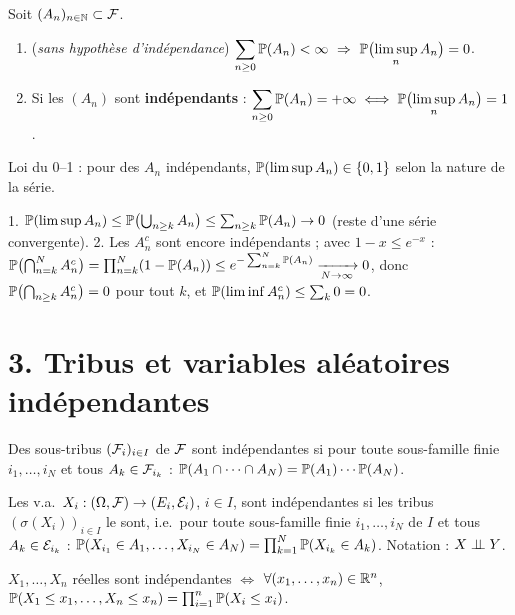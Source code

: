 \documentclass[11pt,a4paper]{article}
\begin{document}
\begin{theoreme}\label{C3:BC}
Soit $(A_n)_{n\in\mathbb{N}}\subset\mathcal{F}$.
\begin{enumerate}
  \item (\emph{sans hypothèse d'indépendance}) $\displaystyle\sum_{n\ge0}\PP(A_n)<\infty\ \Rightarrow\ \PP\bigl(\limsup_n A_n\bigr)=0$.
  \item Si les $(A_n)$ sont \textbf{indépendants} : $\displaystyle\sum_{n\ge0}\mathbb{P}(A_n)=+\infty\iff\mathbb{P}\bigl(\limsup_n A_n\bigr)=1$.
\end{enumerate}
Loi du 0--1 : pour des $A_n$ indépendants, $\mathbb{P}(\limsup A_n)\in\{0,1\}$ selon la nature de la série.
\end{theoreme}
\begin{idee}
1. $\mathbb{P}(\limsup A_n)\le\mathbb{P}\bigl(\bigcup_{n\ge k}A_n\bigr)\le\sum_{n\ge k}\mathbb{P}(A_n)\to0$ (reste d'une série convergente).
2. Les $A_n^c$ sont encore indépendants ; avec $1-x\le e^{-x}$ : $\mathbb{P}\bigl(\bigcap_{n=k}^{N}A_n^c\bigr)=\prod_{n=k}^N(1-\mathbb{P}(A_n))\le e^{-\sum_{n=k}^N\mathbb{P}(A_n)}\xrightarrow[N\to\infty]{}0$,
donc $\mathbb{P}\bigl(\bigcap_{n\ge k}A_n^c\bigr)=0$ pour tout $k$, et $\mathbb{P}(\liminf A_n^c)\le\sum_k0=0$.
\end{idee}

\section*{3. Tribus et variables aléatoires indépendantes}

\begin{definition}\label{C3:tribus}
Des sous-tribus $(\mathcal{F}_i)_{i\in I}$ de $\mathcal{F}$ sont indépendantes si pour toute sous-famille finie $i_1,\dots,i_N$ et tous
$A_k\in\mathcal{F}_{i_k}$ : $\mathbb{P}(A_1\cap\dots\cap A_N)=\mathbb{P}(A_1)\cdots\mathbb{P}(A_N)$.
\end{definition}

\begin{definition}\label{C3:va}
Les v.a.\ $X_i:(\Omega,\mathcal{F})\to(E_i,\mathcal{E}_i)$, $i\in I$, sont indépendantes si les tribus $(\sigma(X_i))_{i\in I}$ le sont, i.e.\
pour toute sous-famille finie $i_1,\dots,i_N$ de $I$ et tous $A_k\in\mathcal{E}_{i_k}$ :
$\mathbb{P}(X_{i_1}\in A_1,\dots,X_{i_N}\in A_N)=\prod_{k=1}^N\mathbb{P}(X_{i_k}\in A_k)$. Notation : $X\perp\!\!\!\perp Y$.
\end{definition}

\begin{lemme}\label{C3:fdr}
$X_1,\dots,X_n$ réelles sont indépendantes $\iff$ $\forall(x_1,\dots,x_n)\in\mathbb{R}^n$,
$\mathbb{P}(X_1\le x_1,\dots,X_n\le x_n)=\prod_{i=1}^n\mathbb{P}(X_i\le x_i)$.
\end{lemme}
\end{document}
